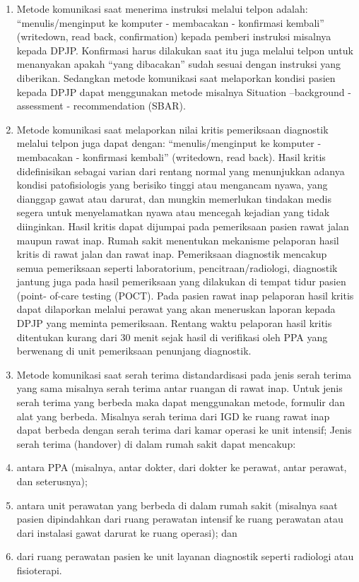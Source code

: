 \documentclass[
]{book}
\begin{document}
\begin{enumerate}
\def\labelenumi{\arabic{enumi}.}
\item
  Metode komunikasi saat menerima instruksi melalui telpon adalah: ``menulis/menginput ke komputer - membacakan - konfirmasi kembali'' (writedown, read back, confirmation) kepada pemberi instruksi misalnya kepada DPJP. Konfirmasi harus dilakukan saat itu juga melalui telpon untuk menanyakan apakah ``yang dibacakan'' sudah sesuai dengan instruksi yang diberikan. Sedangkan metode komunikasi saat melaporkan kondisi pasien kepada DPJP dapat menggunakan metode misalnya Situation --background - assessment - recommendation (SBAR).
\item
  Metode komunikasi saat melaporkan nilai kritis pemeriksaan diagnostik melalui telpon juga dapat dengan: ``menulis/menginput ke komputer - membacakan - konfirmasi kembali'' (writedown, read back). Hasil kritis didefinisikan sebagai varian dari rentang normal yang menunjukkan adanya kondisi patofisiologis yang berisiko tinggi atau mengancam nyawa, yang dianggap gawat atau darurat, dan mungkin memerlukan tindakan medis segera untuk menyelamatkan nyawa atau mencegah kejadian yang tidak diinginkan. Hasil kritis dapat dijumpai pada pemeriksaan pasien rawat jalan maupun rawat inap. Rumah sakit menentukan mekanisme pelaporan hasil kritis di rawat jalan dan rawat inap. Pemeriksaan diagnostik mencakup semua pemeriksaan seperti laboratorium, pencitraan/radiologi, diagnostik jantung juga pada hasil pemeriksaan yang dilakukan di tempat tidur pasien (point- of-care testing (POCT). Pada pasien rawat inap pelaporan hasil kritis dapat dilaporkan melalui perawat yang akan meneruskan laporan kepada DPJP yang meminta pemeriksaan. Rentang waktu pelaporan hasil kritis ditentukan kurang dari 30 menit sejak hasil di verifikasi oleh PPA yang berwenang di unit pemeriksaan penunjang diagnostik.
\item
  Metode komunikasi saat serah terima distandardisasi pada jenis serah terima yang sama misalnya serah terima antar ruangan di rawat inap. Untuk jenis serah terima yang berbeda maka dapat menggunakan metode, formulir dan alat yang berbeda. Misalnya serah terima dari IGD ke ruang rawat inap dapat berbeda dengan serah terima dari kamar operasi ke unit intensif;
  Jenis serah terima (handover) di dalam rumah sakit dapat mencakup:
\item
  antara PPA (misalnya, antar dokter, dari dokter ke perawat, antar perawat, dan seterusnya);
\item
  antara unit perawatan yang berbeda di dalam rumah sakit (misalnya saat pasien dipindahkan dari ruang perawatan intensif ke ruang perawatan atau dari instalasi gawat darurat ke ruang operasi); dan
\item
  dari ruang perawatan pasien ke unit layanan diagnostik seperti radiologi atau fisioterapi.
\end{enumerate}
\end{document}

